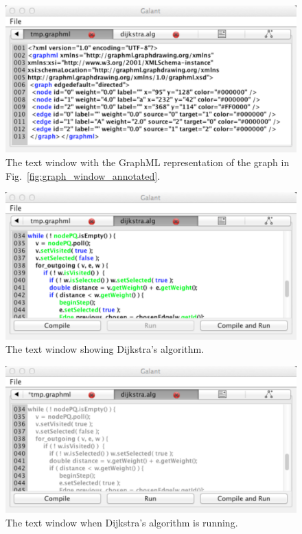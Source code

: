 \begin{figure}[p!]
\includegraphics[scale=0.5]{X_graphml_window}
\caption{The text window with the GraphML representation of the graph in
Fig.~\ref{fig:graph_window_annotated}.}
\label{fig:graphml_window}
\end{figure}

\begin{figure}[p!]
\includegraphics[scale=0.5]{X_algorithm_window}
\caption{The text window showing Dijkstra's algorithm.}
\label{fig:algorithm_text}
\end{figure}

\begin{figure}[p!]
\includegraphics[scale=0.5]{X_algorithm_running}
\caption{The text window when Dijkstra's algorithm is running.}
\label{fig:algorithm_running}
\end{figure}

